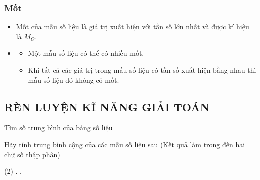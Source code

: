 \subsubsection{Mốt}
\begin{itemize}
	\item [] Mốt của mẫu số liệu là giá trị xuất hiện với tần số lớn nhất và được kí hiệu là $M_O$.
	\item [] 
	\begin{boxdn}
	\begin{itemize}
		\item [$\bullet$] Một mẫu số liệu có thể có nhiều mốt.
		\item [$\bullet$] Khi tất cả các giá trị trong mấu số liệu có tần số xuất hiện bằng nhau thì mẫu số liệu đó không có mốt.
	\end{itemize}
	\end{boxdn}
\end{itemize}

\subsection{RÈN LUYỆN KĨ NĂNG GIẢI TOÁN}

\begin{dang}{Tìm số trung bình của bảng số liệu}
\end{dang}

\begin{vd}%
	Hãy tính trung bình cộng của các mẫu số liệu sau (Kết quả làm trong đến hai chữ số thập phân)
	\begin{tasks}(2)
		 \quad 6      .
		      .
	\end{tasks}
\end{vd}


